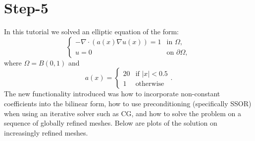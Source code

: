 \documentclass[11pt,fullpage]{article}
\newcommand{\abs}[1]{\left\vert#1\right\vert}
\newcommand{\grad}{\nabla}
\theoremstyle{lemma}
\theoremstyle{definition}
\theoremstyle{lemma}
\begin{document}
\section*{Step-5}
In this tutorial we solved an elliptic equation of the form:
$$
\begin{cases}
-\grad \cdot(a(x)\grad u(x)) = 1 &\text{in }\Omega,\\
u = 0 & \text{on }\partial\Omega,
\end{cases}
$$
where $\Omega = B(0,1)$ and 
$$
a(x) = \begin{cases}
20 & \text{if }\abs{x} < 0.5\\
1 & \text{otherwise}
\end{cases}.
$$ 
The new functionality introduced was how to incorporate non-constant coefficients into the bilinear form, how to use preconditioning (specifically SSOR) when using an iterative solver such as CG, and how to solve the problem on a sequence of globally refined meshes. Below are plots of the solution on increasingly refined meshes.
\end{document}
